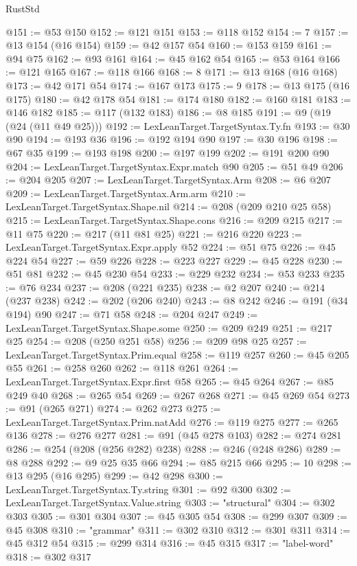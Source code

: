 \begin{lexlean}{RustStd}
\begin{coremodule}
@151 := @53 @150
@152 := @121 @151
@153 := @118 @152
@154 := 7
@157 := @13 @154 (@16 @154)
@159 := @42 @157 @54
@160 := @153 @159
@161 := @94 @75
@162 := @93 @161
@164 := @45 @162 @54
@165 := @53 @164
@166 := @121 @165
@167 := @118 @166
@168 := 8
@171 := @13 @168 (@16 @168)
@173 := @42 @171 @54
@174 := @167 @173
@175 := 9
@178 := @13 @175 (@16 @175)
@180 := @42 @178 @54
@181 := @174 @180
@182 := @160 @181
@183 := @146 @182
@185 := @117 (@132 @183)
@186 := @8 @185
@191 := @9 (@19 (@24 (@11 @49 @25)))
@192 := LexLeanTarget.TargetSyntax.Ty.fn
@193 := @30 @90
@194 := @193 @36
@196 := @192 @194 @90
@197 := @30 @196
@198 := @67 @35
@199 := @193 @198
@200 := @197 @199
@202 := @191 @200 @90
@204 := LexLeanTarget.TargetSyntax.Expr.match @90
@205 := @51 @49
@206 := @204 @205
@207 := LexLeanTarget.TargetSyntax.Arm
@208 := @6 @207
@209 := LexLeanTarget.TargetSyntax.Arm.arm
@210 := LexLeanTarget.TargetSyntax.Shape.nil
@214 := @208 (@209 @210 @25 @58)
@215 := LexLeanTarget.TargetSyntax.Shape.cons
@216 := @209 @215
@217 := @11 @75
@220 := @217 (@11 @81 @25)
@221 := @216 @220
@223 := LexLeanTarget.TargetSyntax.Expr.apply @52
@224 := @51 @75
@226 := @45 @224 @54
@227 := @59 @226
@228 := @223 @227
@229 := @45 @228
@230 := @51 @81
@232 := @45 @230 @54
@233 := @229 @232
@234 := @53 @233
@235 := @76 @234
@237 := @208 (@221 @235)
@238 := @2 @207
@240 := @214 (@237 @238)
@242 := @202 (@206 @240)
@243 := @8 @242
@246 := @191 (@34 @194) @90
@247 := @71 @58
@248 := @204 @247
@249 := LexLeanTarget.TargetSyntax.Shape.some
@250 := @209 @249
@251 := @217 @25
@254 := @208 (@250 @251 @58)
@256 := @209 @98 @25
@257 := LexLeanTarget.TargetSyntax.Prim.equal
@258 := @119 @257
@260 := @45 @205 @55
@261 := @258 @260
@262 := @118 @261
@264 := LexLeanTarget.TargetSyntax.Expr.first @58
@265 := @45 @264
@267 := @85 @249 @40
@268 := @265 @54
@269 := @267 @268
@271 := @45 @269 @54
@273 := @91 (@265 @271)
@274 := @262 @273
@275 := LexLeanTarget.TargetSyntax.Prim.natAdd
@276 := @119 @275
@277 := @265 @136
@278 := @276 @277
@281 := @91 (@45 @278 @103)
@282 := @274 @281
@286 := @254 (@208 (@256 @282) @238)
@288 := @246 (@248 @286)
@289 := @8 @288
@292 := @9 @25 @35 @66
@294 := @85 @215 @66
@295 := 10
@298 := @13 @295 (@16 @295)
@299 := @42 @298
@300 := LexLeanTarget.TargetSyntax.Ty.string
@301 := @92 @300
@302 := LexLeanTarget.TargetSyntax.Value.string
@303 := "structural"
@304 := @302 @303
@305 := @301 @304
@307 := @45 @305 @54
@308 := @299 @307
@309 := @45 @308
@310 := "grammar"
@311 := @302 @310
@312 := @301 @311
@314 := @45 @312 @54
@315 := @299 @314
@316 := @45 @315
@317 := "label-word"
@318 := @302 @317

\end{coremodule}
\end{lexlean}
